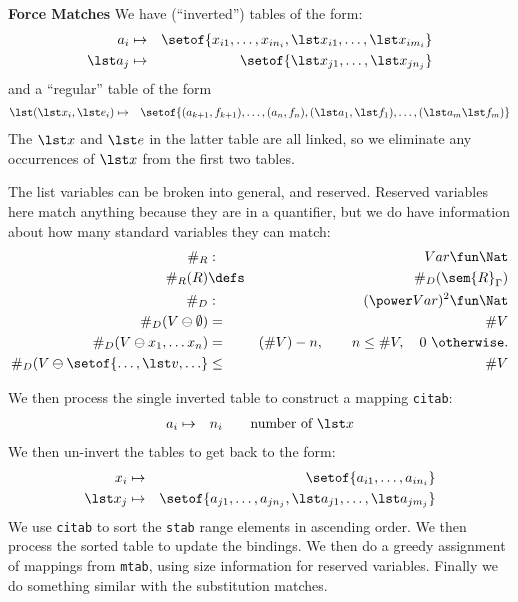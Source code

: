 \textbf{Force Matches}
We have (``inverted'') tables of the form:
 \begin{eqnarray*}
   a_i &\mapsto& \setof{x_{i1},\ldots,x_{in_i}, \lst x_{i1},\ldots,\lst x_{im_i}}
 \\ \lst a_j &\mapsto& \setof{ \lst x_{j1},\ldots,\lst x_{jn_j}}
 \end{eqnarray*}
and a ``regular'' table of the form
\begin{eqnarray*}
  \lst (\lst x_i,\lst e_i) &\mapsto&
    \setof{(a_{k+1},f_{k+1}),\ldots,(a_n,f_n), (\lst a_1,\lst f_1),\ldots,(\lst a_m\lst f_m)}
\end{eqnarray*}
The $\lst x$ and $\lst e$ in the latter table are all linked,
so we eliminate any occurrences of $\lst x$ from the first two tables.

The list variables can be broken into general, and reserved.
  Reserved variables here match anything because they are in a quantifier,
  but we do have information about how many standard variables they can
  match:
  \begin{eqnarray*}
     \#_R &:& Var \fun \Nat
  \\ \#_R(R) &\defs& \#_D(\sem{R}_\Gamma)
  \\ \#_D &:& (\power Var)^2 \fun \Nat
  \\ \#_D(V\ominus \emptyset ) &=& \# V
  \\ \#_D(V \ominus x_1,\ldots x_n) &=& (\# V) - n, \qquad n \leq \# V, \quad 0~ \otherwise.
  \\ \#_D(V \ominus \setof{\ldots,\lst v,\ldots} &\leq& \# V
  \end{eqnarray*}


We then process the single inverted table to construct a mapping \texttt{citab}:
\begin{eqnarray*}
  a_i &\mapsto& n_i \qquad \mbox{number of $\lst x$}
\end{eqnarray*}
We then un-invert the tables to get back to the form:
\begin{eqnarray*}
  x_i &\mapsto& \setof{a_{i1},\ldots,a_{in_i}}
\\ \lst x_j &\mapsto& \setof{a_{j1},\ldots,a_{jn_j}, \lst a_{j1},\ldots,\lst a_{jm_j}}
\end{eqnarray*}
We use \texttt{citab} to sort the \texttt{stab} range elements in ascending order.
We then process the sorted table to update the bindings.
We then do a greedy assignment of mappings from  \texttt{mtab},
using size information for reserved variables.
Finally we do something similar with the substitution matches.
